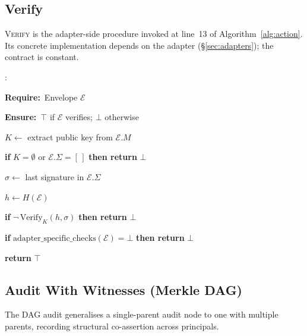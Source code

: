 \documentclass[11pt,a4paper]{article}
\newcommand{\AlgKwd}[1]{\textbf{#1}}
\newcommand{\Require}{\AlgKwd{Require:}~}
\newcommand{\Ensure}{\AlgKwd{Ensure:}~}
\newenvironment{algorithmic}
  {\begin{framed}\small\begin{list}{\arabic{enumi}:}{%
      \usecounter{enumi}\setlength{\itemsep}{0pt}\setlength{\parsep}{0pt}%
      \setlength{\leftmargin}{2.2em}\setlength{\labelwidth}{1.8em}}}
  {\end{list}\end{framed}}
\begin{document}
\subsection{Verify}

\textsc{Verify} is the adapter-side procedure invoked at line~13 of
Algorithm~\ref{alg:action}. Its concrete implementation depends on the
adapter (\S\ref{sec:adapters}); the contract is constant.

\begin{algo}
\caption{\textsc{Verify}($\mathcal{E}$)}\label{alg:verify}
\begin{algorithmic}
\item \Require Envelope $\mathcal{E}$
\item \Ensure $\top$ if $\mathcal{E}$ verifies; $\bot$ otherwise
\item $K \gets$ extract public key from $\mathcal{E}.M$
\item \textbf{if} $K = \emptyset$ or $\mathcal{E}.\Sigma = [\,]$ \textbf{then return} $\bot$
\item $\sigma \gets$ last signature in $\mathcal{E}.\Sigma$
\item $h \gets H(\mathcal{E})$
\item \textbf{if} $\neg\,\mathrm{Verify}_K(h, \sigma)$ \textbf{then return} $\bot$
\item \textbf{if} $\mathrm{adapter\_specific\_checks}(\mathcal{E}) = \bot$ \textbf{then return} $\bot$
\item \textbf{return} $\top$
\end{algorithmic}
\end{algo}

\subsection{Audit With Witnesses (Merkle DAG)}\label{sec:dag-audit}

The DAG audit generalises a single-parent audit node to one with
multiple parents, recording structural co-assertion across principals.
\end{document}

